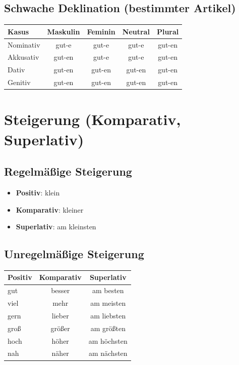 \subsection{Schwache Deklination (bestimmter Artikel)}
\begin{center}
\begin{tabular}{|l|c|c|c|c|}
\hline
\textbf{Kasus} & \textbf{Maskulin} & \textbf{Feminin} & \textbf{Neutral} & \textbf{Plural} \\ \hline
Nominativ & gut-e & gut-e & gut-e & gut-en \\ \hline
Akkusativ & gut-en & gut-e & gut-e & gut-en \\ \hline
Dativ & gut-en & gut-en & gut-en & gut-en \\ \hline
Genitiv & gut-en & gut-en & gut-en & gut-en \\ \hline
\end{tabular}
\end{center}

\section{Steigerung (Komparativ, Superlativ)}
\label{sec:AdjSteigerung}

\subsection{Regelmäßige Steigerung}
\begin{itemize}
    \item \textbf{Positiv}: klein
    \item \textbf{Komparativ}: kleiner
    \item \textbf{Superlativ}: am kleinsten
\end{itemize}

\subsection{Unregelmäßige Steigerung}
\begin{center}
\begin{tabular}{|l|c|c|}
\hline
\textbf{Positiv} & \textbf{Komparativ} & \textbf{Superlativ} \\ \hline
gut & besser & am besten \\ \hline
viel & mehr & am meisten \\ \hline
gern & lieber & am liebsten \\ \hline
groß & größer & am größten \\ \hline
hoch & höher & am höchsten \\ \hline
nah & näher & am nächsten \\ \hline
\end{tabular}
\end{center}


